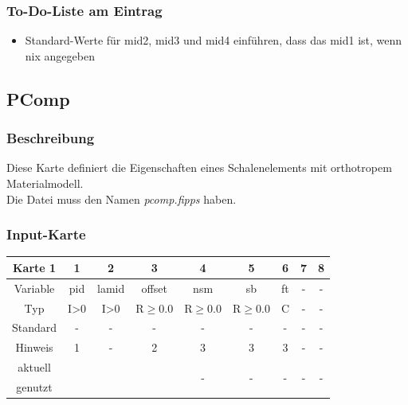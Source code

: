 \documentclass[11pt,titlepage,listof=totoc,bibliography=totoc,twoside]{scrreprt}
\begin{document}
{{\subsubsection{To-Do-Liste am Eintrag}

\begin{itemize}
\item Standard-Werte für mid2, mid3 und mid4 einführen, dass das mid1 ist, wenn nix angegeben
\end{itemize}

\newpage

\subsection{PComp}

\subsubsection{Beschreibung}

Diese Karte definiert die Eigenschaften eines Schalenelements mit orthotropem Materialmodell.\\
Die Datei muss den Namen \emph{pcomp.fipps} haben.

\subsubsection{Input-Karte}

\begin{table}[htbp]
\centering
\begin{tabularx}{\textwidth}{cCCCCCCCC}
\toprule
Karte 1	& 1		& 2		& 3		& 4		& 5		& 6		& 7		& 8	\\
\midrule
Variable& pid		& lamid		& offset	& nsm		& sb		& ft		& -		& -	\\
Typ	& I>0		& I>0		& R$\ge$0.0	& R$\ge$0.0	& R$\ge$0.0	& C		& -		& -	\\
Standard& -		& -		& -		& -		& -		& -		& -		& -	\\
Hinweis	& 1		& -		& 2		& 3		& 3		& 3		& -		& -	\\
aktuell	& 	& 	& 	& 	& 	& \multirow{2}{*}{-}	& 	& 	\\
genutzt \\
\bottomrule
\end{tabularx}
\end{table}

}}
\end{document}
